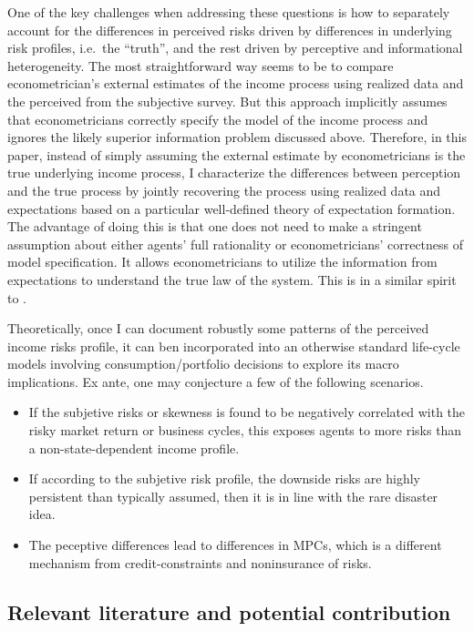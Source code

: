 \documentclass[12pt,notitlepage,onecolumn,aps,pra]{article}
\begin{document}
One of the key challenges when addressing these questions is how to
separately account for the differences in perceived risks driven by
differences in underlying risk profiles, i.e.~the ``truth'', and the
rest driven by perceptive and informational heterogeneity. The most
straightforward way seems to be to compare econometrician's external
estimates of the income process using realized data and the perceived
from the subjective survey. But this approach implicitly assumes that
econometricians correctly specify the model of the income process and
ignores the likely superior information problem discussed above.
Therefore, in this paper, instead of simply assuming the external
estimate by econometricians is the true underlying income process, I
characterize the differences between perception and the true process by
jointly recovering the process using realized data and expectations
based on a particular well-defined theory of expectation formation. The
advantage of doing this is that one does not need to make a stringent
assumption about either agents' full rationality or econometricians'
correctness of model specification. It allows econometricians to utilize
the information from expectations to understand the true law of the
system. This is in a similar spirit to \cite{guvenen_inferring_2014}.

Theoretically, once I can document robustly some patterns of the
perceived income risks profile, it can ben incorporated into an
otherwise standard life-cycle models involving consumption/portfolio
decisions to explore its macro implications. Ex ante, one may conjecture
a few of the following scenarios.

\begin{itemize}
\item
  If the subjetive risks or skewness is found to be negatively
  correlated with the risky market return or business cycles, this
  exposes agents to more risks than a non-state-dependent income
  profile.
\item
  If according to the subjetive risk profile, the downside risks are
  highly persistent than typically assumed, then it is in line with the
  rare disaster idea.
\item
  The peceptive differences lead to differences in MPCs, which is a
  different mechanism from credit-constraints and noninsurance of risks.
\end{itemize}

\hypertarget{relevant-literature-and-potential-contribution}{%
\subsection{Relevant literature and potential
contribution}\label{relevant-literature-and-potential-contribution}}
\end{document}
